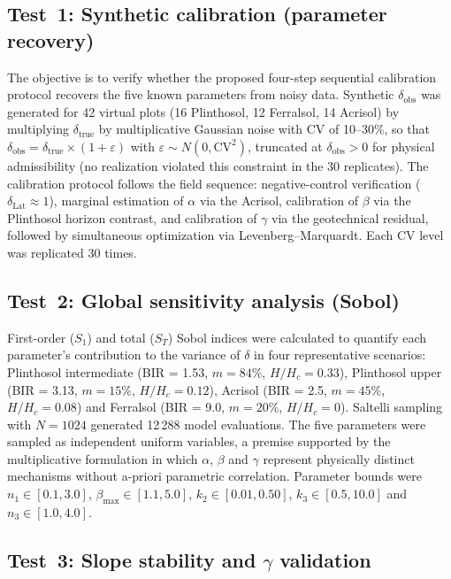 \documentclass[preprint,review,12pt,authoryear]{elsarticle}
\begin{document}
\subsection{Test~1: Synthetic calibration (parameter recovery)}

The objective is to verify whether the proposed four-step sequential calibration protocol recovers the five known parameters from noisy data. Synthetic $\delta_{\mathrm{obs}}$ was generated for 42 virtual plots (16 Plinthosol, 12 Ferralsol, 14 Acrisol) by multiplying $\delta_{\mathrm{true}}$ by multiplicative Gaussian noise with CV of 10--30\%, so that $\delta_{\mathrm{obs}} = \delta_{\mathrm{true}} \times (1 + \varepsilon)$ with $\varepsilon \sim N(0, \mathrm{CV}^2)$, truncated at $\delta_{\mathrm{obs}} > 0$ for physical admissibility (no realization violated this constraint in the 30 replicates). The calibration protocol follows the field sequence: negative-control verification ($\delta_{\mathrm{Lat}} \approx 1$), marginal estimation of $\alpha$ via the Acrisol, calibration of $\beta$ via the Plinthosol horizon contrast, and calibration of $\gamma$ via the geotechnical residual, followed by simultaneous optimization via Levenberg--Marquardt. Each CV level was replicated 30 times.

\subsection{Test~2: Global sensitivity analysis (Sobol)}

First-order ($S_1$) and total ($S_T$) Sobol indices \citep{sobol_2001} were calculated to quantify each parameter's contribution to the variance of $\delta$ in four representative scenarios: Plinthosol intermediate (BIR = 1.53, $m = 84\%$, $H/H_c = 0.33$), Plinthosol upper (BIR = 3.13, $m = 15\%$, $H/H_c = 0.12$), Acrisol (BIR = 2.5, $m = 45\%$, $H/H_c = 0.08$) and Ferralsol (BIR = 9.0, $m = 20\%$, $H/H_c = 0$). Saltelli sampling \citep{saltelli_et_al_2004} with $N = 1024$ generated 12\,288 model evaluations. The five parameters were sampled as independent uniform variables, a premise supported by the multiplicative formulation in which $\alpha$, $\beta$ and $\gamma$ represent physically distinct mechanisms without a-priori parametric correlation. Parameter bounds were $n_1 \in [0.1, 3.0]$, $\beta_{\max} \in [1.1, 5.0]$, $k_2 \in [0.01, 0.50]$, $k_3 \in [0.5, 10.0]$ and $n_3 \in [1.0, 4.0]$.

\subsection{Test~3: Slope stability and $\gamma$ validation}
\label{sec:test3}
\end{document}
